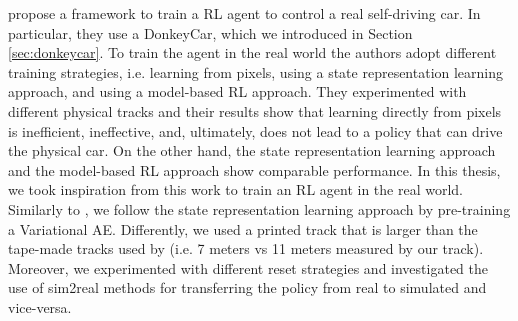 \citet{DBLP:journals/corr/abs-2008-00715} propose a framework to train a RL agent to control a real self-driving car. In particular, they use a DonkeyCar, which we introduced in Section \ref{sec:donkeycar}. To train the agent in the real world the authors adopt different training strategies, i.e. learning from pixels, using a state representation learning approach, and using a model-based RL approach. They experimented with different physical tracks and their results show that learning directly from pixels is inefficient, ineffective, and, ultimately, does not lead to a policy that can drive the physical car. On the other hand, the state representation learning approach and the model-based RL approach show comparable performance.
In this thesis, we took inspiration from this work to train an RL agent in the real world. Similarly to \citet{DBLP:journals/corr/abs-2008-00715}, we follow the state representation learning approach by pre-training a Variational AE. Differently, we used a printed track that is larger than the tape-made tracks used by \citet{DBLP:journals/corr/abs-2008-00715} (i.e. 7 meters vs 11 meters measured by our track). Moreover, we experimented with different reset strategies and investigated the use of sim2real methods for transferring the policy from real to simulated and vice-versa.